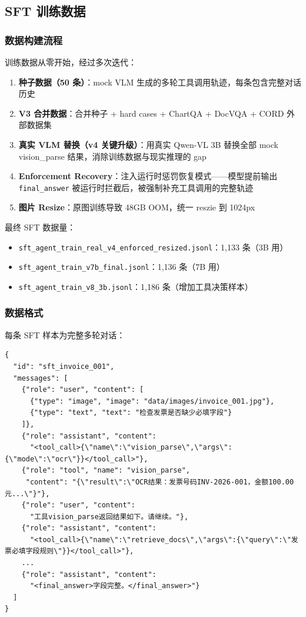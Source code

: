 \documentclass[12pt,a4paper]{ctexart}
\begin{document}
\subsection{SFT 训练数据}

\subsubsection{数据构建流程}

训练数据从零开始，经过多次迭代：

\begin{enumerate}
  \item \textbf{种子数据（50 条）}：mock VLM 生成的多轮工具调用轨迹，每条包含完整对话历史
  \item \textbf{V3 合并数据}：合并种子 + hard cases + ChartQA + DocVQA + CORD 外部数据集
  \item \textbf{真实 VLM 替换（v4 关键升级）}：用真实 Qwen-VL 3B 替换全部 mock vision\_parse 结果，消除训练数据与现实推理的 gap
  \item \textbf{Enforcement Recovery}：注入运行时惩罚恢复模式——模型提前输出 \texttt{final\_answer} 被运行时拦截后，被强制补充工具调用的完整轨迹
  \item \textbf{图片 Resize}：原图训练导致 48GB OOM，统一 reszie 到 1024px
\end{enumerate}

最终 SFT 数据量：

\begin{itemize}[nosep]
  \item \texttt{sft\_agent\_train\_real\_v4\_enforced\_resized.jsonl}：1,133 条（3B 用）
  \item \texttt{sft\_agent\_train\_v7b\_final.jsonl}：1,136 条（7B 用）
  \item \texttt{sft\_agent\_train\_v8\_3b.jsonl}：1,186 条（增加工具决策样本）
\end{itemize}

\subsubsection{数据格式}

每条 SFT 样本为完整多轮对话：

\begin{lstlisting}
{
  "id": "sft_invoice_001",
  "messages": [
    {"role": "user", "content": [
      {"type": "image", "image": "data/images/invoice_001.jpg"},
      {"type": "text", "text": "检查发票是否缺少必填字段"}
    ]},
    {"role": "assistant", "content":
      "<tool_call>{\"name\":\"vision_parse\",\"args\":{\"mode\":\"ocr\"}}</tool_call>"},
    {"role": "tool", "name": "vision_parse",
     "content": "{\"result\":\"OCR结果：发票号码INV-2026-001，金额100.00元...\"}"},
    {"role": "user", "content":
      "工具vision_parse返回结果如下。请继续。"},
    {"role": "assistant", "content":
      "<tool_call>{\"name\":\"retrieve_docs\",\"args\":{\"query\":\"发票必填字段规则\"}}</tool_call>"},
    ...
    {"role": "assistant", "content":
      "<final_answer>字段完整。</final_answer>"}
  ]
}
\end{lstlisting}
\end{document}
